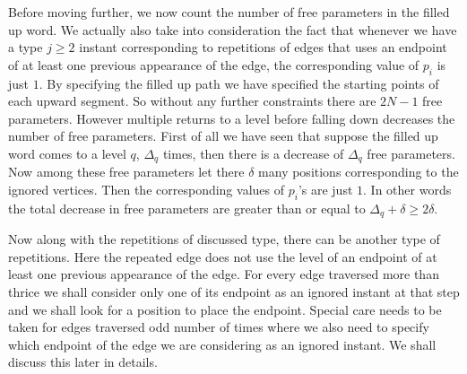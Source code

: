 \documentclass[12pt]{article}
\numberwithin{equation}{section}
\numberwithin{equation}{section}
\theoremstyle{definition}
\renewcommand{\1}{\bf 1}
\begin{document}
\noindent 
Before moving further, we now count the number of free parameters in the filled up word. We actually also take into consideration the fact that whenever we have a type $j\ge 2$ instant corresponding to repetitions of edges that uses an endpoint of at least one previous appearance of the edge, the corresponding value of $p_{i}$ is just $1$. By specifying the filled up path we have specified the starting points of each upward segment. So without any further constraints there are $2N-1$ free parameters. However multiple returns to a level before falling down decreases the number of free parameters. First of all we have seen that suppose the filled up word comes to a level $q$, $\Delta_{q}$ times, then there is a decrease of $\Delta_{q}$ free parameters. %
 Now among these free parameters let there $\delta$ many positions corresponding to the ignored vertices. Then the corresponding values of $p_{i}$'s are just $1$. %
In other words the total decrease in free parameters are greater than or equal to $\Delta_{q} + \delta \ge 2\delta$.    


Now along with the repetitions of discussed type, there can be another type of repetitions. Here the repeated edge does not use the level of an endpoint of at least one previous appearance of the edge. %
For every edge traversed more than thrice we shall consider only one of its endpoint as an ignored instant at that step and we shall look for a position to place the endpoint. Special care needs to be taken for edges traversed odd number of times where we also need to specify which endpoint of the edge we are considering as an ignored instant. We shall discuss this later in details.     
\end{document}
